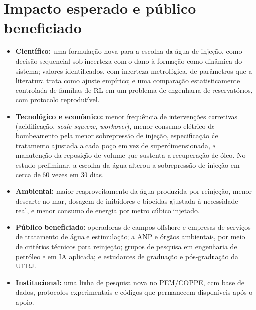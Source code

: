 \documentclass[11pt,a4paper]{article}
\newcommand{\itemedital}[1]{}
\begin{document}
\section{Impacto esperado e público beneficiado}\itemedital{2.16 XXI; Anexo 1 E}
\begin{itemize}
  \item \textbf{Científico:} uma formulação nova para a escolha da água de injeção, como decisão
        sequencial sob incerteza com o dano à formação como dinâmica do sistema; valores
        identificados, com incerteza metrológica, de parâmetros que a literatura trata como
        ajuste empírico; e uma comparação estatisticamente controlada de famílias de RL em um
        problema de engenharia de reservatórios, com protocolo reprodutível.
  \item \textbf{Tecnológico e econômico:} menor frequência de intervenções corretivas
        (acidificação, \textit{scale squeeze}, \textit{workover}), menor consumo elétrico de
        bombeamento pela menor sobrepressão de injeção, especificação de tratamento ajustada a
        cada poço em vez de superdimensionada, e manutenção da reposição de volume que sustenta
        a recuperação de óleo. No estudo preliminar, a escolha da água alterou a sobrepressão
        de injeção em cerca de 60 vezes em 30 dias.
  \item \textbf{Ambiental:} maior reaproveitamento da água produzida por reinjeção, menor
        descarte no mar, dosagem de inibidores e biocidas ajustada à necessidade real, e menor
        consumo de energia por metro cúbico injetado.
  \item \textbf{Público beneficiado:} operadoras de campos offshore e empresas de serviços de
        tratamento de água e estimulação; a ANP e órgãos ambientais, por meio de critérios
        técnicos para reinjeção; grupos de pesquisa em engenharia de petróleo e em IA aplicada;
        e estudantes de graduação e pós-graduação da UFRJ.
  \item \textbf{Institucional:} uma linha de pesquisa nova no PEM/COPPE, com base de dados,
        protocolos experimentais e códigos que permanecem disponíveis após o apoio.
\end{itemize}

\end{document}
